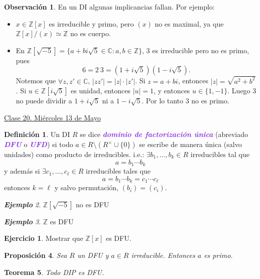 \documentclass{article}
\newtheorem{theorem}{Teorema}[subsection]
\newtheorem{proposition}[theorem]{Proposición}
\theoremstyle{definition}
\newtheorem{definition}[theorem]{Definición}
\newtheorem{exercise}{Ejercicio}
\newtheorem*{obs}{Observación}
\theoremstyle{remark}
\newtheorem{example}[theorem]{\textbf{Ejemplo}}
\numberwithin{equation}{section}
\newcommand{\C}{\mathbb{C}}
\newcommand{\Z}{\mathbb{Z}}
\renewcommand{\c}{\cdot}
\newcommand{\abs}[1]{\left| #1 \right|}
\newcommand{\wea}[1]{\textcolor{BlueViolet}{\textbf{\emph{#1}}}}
\newcommand{\fecha}[1]{\begin{flushright} \underline{#1} \end{flushright}}
\begin{document}
\begin{obs}
  En un DI algunas implicancias fallan. Por ejemplo:
  \begin{itemize}
    \item $x \in \Z[x]$ es irreducible y primo, pero $(x)$ no es maximal, ya que $\Z[x]/(x) \simeq \Z$ no es cuerpo.
    \item En $\Z[\sqrt{-5}] = \{a + bi \sqrt{5} \in \C \colon a,b \in \Z\}$, 3 es irreducible pero no es primo, pues 
    \[ 6 = 2 \ 3 = (1+i\sqrt5)(1-i\sqrt5). \]
    Notemos que $\forall z,z' \in \C$, $\abs{zz'} = \abs z \c \abs{z'}$. Si $z = a+bi$, entonces $\abs z = \sqrt{a^2+b^2}$. Si $u \in \Z[i\sqrt5]$ es unidad, entonces $\abs u = 1$, y entonces $u \in \{1,-1\}$. Luego 3 no puede dividir a $1+i\sqrt5$ ni a $1 - i \sqrt5$. Por lo tanto 3 no es primo. %
  \end{itemize}
\end{obs}

\fecha{Clase 20. Miércoles 13 de Mayo}

\begin{definition}
  Un DI $R$ se dice \wea{dominio de factorización única} (abreviado \wea{DFU} o \wea{UFD}) si todo $a \in R \setminus (R^\times \cup \{0\})$ se escribe de manera única (salvo unidades) como producto de irreducibles. i.e.: $\exists b_1,\dots,b_k \in R$ irreducibles tal que 
  \[ a = b_1 \cdots b_k \]
  y además si $\exists c_1,\dots,c_\ell \in R$ irreducibles tales que 
  \[ a = b_1 \cdots b_k = c_1 \cdots c_\ell \]
  entonces $k = \ell$ y salvo permutación, $(b_i) = (c_i)$.
\end{definition}

\begin{example}
  $\Z[\sqrt{-5}]$ no es DFU
\end{example}

\begin{example}
  $\Z$ es DFU
\end{example}

\begin{exercise}
  Mostrar que $\Z[x]$ es DFU.
\end{exercise}

\begin{proposition}
  Sea $R$ un DFU y $a \in R$ irreducible. Entonces $a$ es primo.
\end{proposition}

\begin{theorem}
  Todo DIP es DFU.
\end{theorem}
\end{document}

